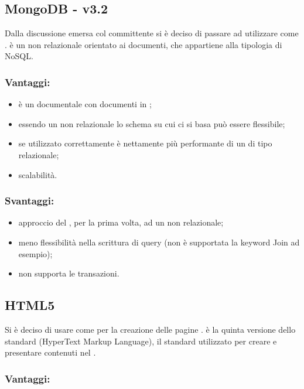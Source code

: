\documentclass[a4paper, titlepage]{article}
\begin{document}
\subsection{MongoDB - v3.2}
Dalla discussione emersa col committente si è deciso di passare ad utilizzare  come .  è un  non relazionale orientato ai documenti, che appartiene alla tipologia di  NoSQL.

\subsubsection{Vantaggi:}
\begin{itemize}
	\item è un  documentale con documenti in ;
	\item essendo un  non relazionale lo schema su cui ci si basa può essere flessibile;
	\item se utilizzato correttamente è nettamente più performante di un  di tipo relazionale;
	\item scalabilità.
\end{itemize}

\subsubsection{Svantaggi:}
\begin{itemize}
	\item approccio del , per la prima volta, ad un  non relazionale;
	\item meno flessibilità nella scrittura di query (non è supportata la keyword Join ad esempio);
	\item non supporta le transazioni.
\end{itemize}

\subsection{HTML5}
Si è deciso di usare  come  per la creazione delle pagine .  è la quinta versione dello standard  (HyperText Markup Language), il  standard utilizzato per creare e presentare contenuti nel .

\subsubsection{Vantaggi:}
\end{document}

